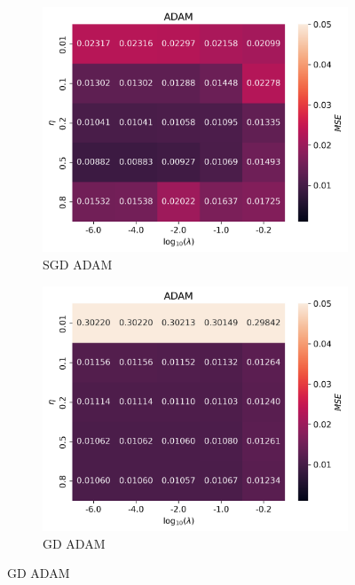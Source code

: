\documentclass[11pt]{article}
\begin{document}
\begin{figure}[H]

    \begin{subfigure}{.5\textwidth}
        \centering
        \includegraphics[width=\textwidth]{../figures/ADAM_SGD_eta_lmb.png}
        \caption{SGD ADAM}
        \label{fig:}
    \end{subfigure}
    \begin{subfigure}{.5\textwidth}
        \centering
        \includegraphics[width=\textwidth]{../figures/ADAM_GD_eta_lmb.png}
        \caption{GD ADAM}
        \label{fig:}
    \end{subfigure}

\end{figure}
\end{document}
